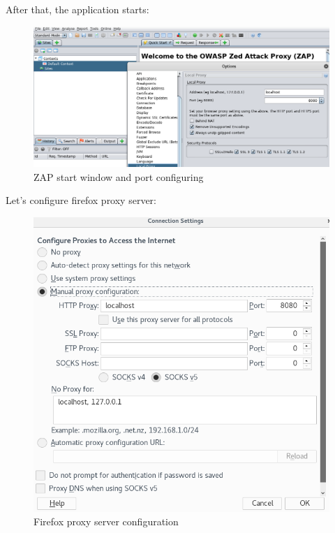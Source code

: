 \documentclass[14pt,a4paper,report]{report}
\begin{document}


After that, the application starts:

\begin{figure}[h!]
	\centering
	\includegraphics[scale = 0.60]{images/3.png}
	\caption{ZAP start window and port configuring}
\end{figure}

\clearpage

Let's configure firefox proxy server:

\begin{figure}[h!]
	\centering
	\includegraphics[scale = 0.60]{images/4.png}
	\caption{Firefox proxy server configuration}
\end{figure}
\end{document}
